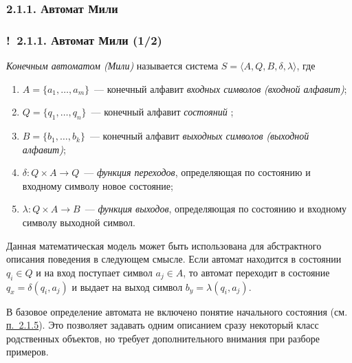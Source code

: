 \documentclass[mathserif,12pt,aspectratio=169]{beamer}
\renewcommand{\index}[1]{}
\def\odmkey#1#2{{\it\color{red} #1}\index{#2}}
\def\DMref#1#2{{\color{blue}\underline{\hyperlink{#2}{#1}}}}
\def\Ok{{\color{green}\textbf{!}\ }}
\begin{document}
\subsubsection{2.1.1. Автомат Мили}\label{2.1.1.}
\begin{frame}
\frametitle{\Ok 2.1.1. Автомат Мили (1/2)}
\odmkey{Конечным автоматом (Мили)}{Автомат!конечный}
\odmkey{}{Автомат!Мили} \odmkey{}{Конечный автомат} называется
система $S=\langle A,Q,B,\delta,\lambda\rangle$, где
\begin{enumerate}
\item
$A=\{a_1,\ldots,a_m\}$~--- конечный алфавит \odmkey{входных
символов}{Символ!входной} \odmkey{(входной
алфавит)}{Алфавит!входной};
\item
$Q=\{q_1,\ldots,q_n\}$~--- конечный алфавит
\odmkey{состояний}{Алфавит!состояний}\odmkey{}{Состояние};
\item
$B=\{b_1,\ldots,b_k\}$~--- конечный алфавит \odmkey{выходных
символов}{Символ!выходной} \odmkey{(выходной
алфавит)}{Алфавит!выходной};
\item
$\delta:Q\times A\rightarrow Q$~--- \odmkey{функция
переходов}{Функция!переходов}, определяющая по состоянию и
входному символу новое состояние;
\item
$\lambda: Q\times A\rightarrow B$~--- \odmkey{функция
выходов}{Функция!выходов}, определяющая по состоянию и входному
символу выходной символ.
\end{enumerate}

Данная математическая модель может быть использована для
абстрактного описания поведения в следующем смысле. Если автомат
находится в состоянии $q_i\in Q$ и на вход поступает символ
$a_j\in A$, то автомат переходит в состояние $q_x=\delta(q_i,a_j)$
и выдает на выход символ $b_y=\lambda(q_i,a_j)$.

\begin{remark}
В базовое определение
автомата не включено понятие 
начального состояния (см. \DMref{п.~2.1.5}{2.1.5.}). Это позволяет задавать одним описанием сразу некоторый класс родственных объектов, но требует дополнительного внимания 
при разборе примеров.  
\end{remark}

\end{frame}
\end{document}
